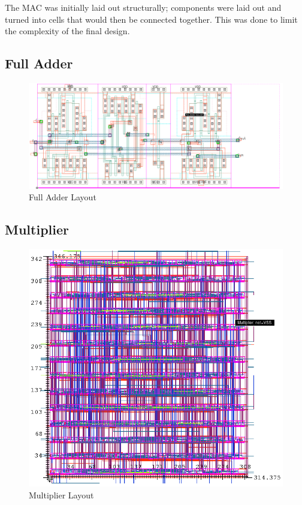 \documentclass[11pt]{article}
\begin{document}
	The MAC was initially laid out structurally; components were laid out and turned into cells that would then be connected together. This was done to limit the complexity of the final design. 
	
	\subsection{Full Adder}
		\begin{figure}[H] 
			\centering 
			\includegraphics[width=\textwidth,height=\dimexpr\textheight-4\baselineskip-\abovecaptionskip-\belowcaptionskip\relax,keepaspectratio]{"Pictures/Full Adder Layout"}
			\caption{Full Adder Layout} 
			\label{fig:Full-Adder-Layout} 
		\end{figure}
	
	\subsection{Multiplier}
	
		\begin{figure}[H] 
			\centering 
			\includegraphics[width=\textwidth,height=\dimexpr\textheight-4\baselineskip-\abovecaptionskip-\belowcaptionskip\relax,keepaspectratio]{"Pictures/Multiplier Layout"}
			\caption{Multiplier Layout} 
			\label{fig:Multiplier-Layout} 
		\end{figure}
	
\end{document}
